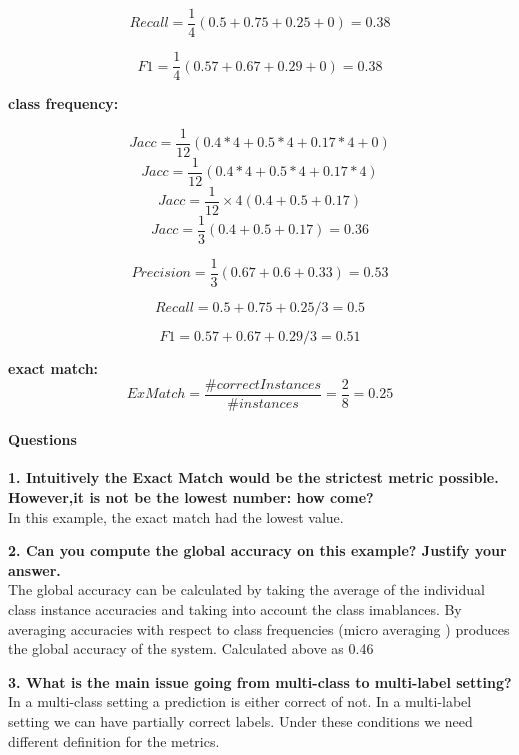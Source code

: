 \documentclass[10pt]{article}
\begin{document}
$$Recall = \frac{1}{4}\left(0.5+0.75+0.25+0\right)= 0.38$$

$$F1 = \frac{1}{4}\left(0.57+0.67+0.29+0\right)= 0.38$$

\textbf{class frequency:}

$$Jacc = \frac{1}{12}\left(0.4*4+0.5*4+0.17*4+0\right)$$
$$Jacc = \frac{1}{12}\left(0.4*4+0.5*4+0.17*4\right)$$
$$Jacc = \frac{1}{12}\times{4} \left(0.4+0.5+0.17\right)$$
$$Jacc = \frac{1}{3} \left(0.4+0.5+0.17\right) = 0.36$$

$$Precision = \frac {1}{3}\left(0.67+0.6+0.33\right)= 0.53$$

$$Recall = 0.5+0.75+0.25 / 3= 0.5$$

$$F1 = 0.57+0.67+0.29 / 3= 0.51$$


\textbf{exact match:}
$$ ExMatch = \frac{\#correct Instances}{\# instances} = \frac{2}{8} = 0.25 $$

\paragraph{Questions\\}

\textbf{1. Intuitively the Exact Match would be the strictest metric possible. However,it is not be the lowest number: how come?\\}
In this example, the exact match had the lowest value.

\textbf{2. Can you compute the global accuracy on this example? Justify your answer.\\}
The global accuracy can be calculated by taking the average of the individual class instance accuracies and taking into account the class imablances.
By averaging accuracies with respect to class frequencies (micro averaging ) produces the global accuracy of the system. Calculated above as 0.46

\textbf{3. What is the main issue going from multi-class to multi-label setting?\\}
In a multi-class setting a prediction is either  correct of not. In a multi-label setting we can have partially correct labels.
Under these conditions we need different definition for the metrics.

   
\end{document}
